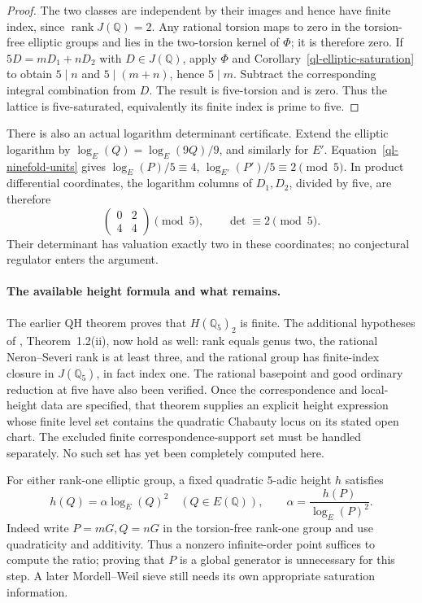 \begin{proof}
The two classes are independent by their images and hence have finite
index, since \(\operatorname{rank}J(\mathbb Q)=2\).
Any rational torsion maps to zero in the torsion-free elliptic groups
and lies in the two-torsion kernel of \(\Phi\); it is therefore zero.
If \(5D=mD_1+nD_2\) with \(D\in J(\mathbb Q)\), apply \(\Phi\)
and Corollary~\ref{ql-elliptic-saturation} to obtain
\(5\mid n\) and \(5\mid(m+n)\), hence \(5\mid m\).
Subtract the corresponding integral combination from \(D\).
The result is five-torsion and is zero. Thus the lattice is
five-saturated, equivalently its finite index is prime to five.
\end{proof}

There is also an actual logarithm determinant certificate. Extend the
elliptic logarithm by \(\log_E(Q)=\log_E(9Q)/9\), and similarly for
\(E'\). Equation~\eqref{ql-ninefold-units} gives
\(\log_E(P)/5\equiv4\), \(\log_{E'}(P')/5\equiv2\pmod5\).
In product differential coordinates, the logarithm columns of
\(D_1,D_2\), divided by five, are therefore
\[
 \begin{pmatrix}0&2\\4&4\end{pmatrix}\pmod5,
 \qquad \det\equiv2\pmod5.
\]
Their determinant has valuation exactly two in these coordinates;
no conjectural regulator enters the argument.

\paragraph{The available height formula and what remains.}
The earlier QH theorem proves that \(H(\mathbb Q_5)_2\) is finite.
The additional hypotheses of \cite{BalakrishnanDograQCI},
Theorem~1.2(ii), now hold as well: rank equals genus two, the rational
Neron--Severi rank is at least three, and the rational group has
finite-index closure in \(J(\mathbb Q_5)\), in fact index one.
The rational basepoint and good ordinary reduction at five have also
been verified. Once the correspondence and local-height data are
specified, that theorem supplies an explicit height expression whose
finite level set contains the quadratic Chabauty locus on its stated
open chart. The excluded finite correspondence-support set must be
handled separately. No such set has yet been completely computed here.

For either rank-one elliptic group, a fixed quadratic \(5\)-adic
height \(h\) satisfies
\[
 h(Q)=\alpha\log_E(Q)^2\quad(Q\in E(\mathbb Q)),\qquad
 \alpha=\frac{h(P)}{\log_E(P)^2}.
\]
Indeed write \(P=mG,Q=nG\) in the torsion-free rank-one group and use
quadraticity and additivity. Thus a nonzero infinite-order point
suffices to compute the ratio; proving that \(P\) is a global
generator is unnecessary for this step. A later Mordell--Weil sieve
still needs its own appropriate saturation information.

